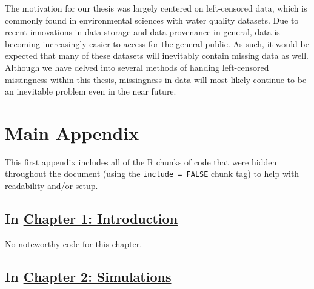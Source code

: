 \documentclass[12pt, twoside]{amherstthesis}
\begin{document}
The motivation for our thesis was largely centered on left-censored data, which is commonly found in environmental sciences with water quality datasets. Due to recent innovations in data storage and data provenance in general, data is becoming increasingly easier to access for the general public. As such, it would be expected that many of these datasets will inevitably contain missing data as well. Although we have delved into several methods of handing left-censored missingness within this thesis, missingness in data will most likely continue to be an inevitable problem even in the near future.

\appendix

\hypertarget{main-appendix}{%
\chapter{Main Appendix}\label{main-appendix}}

This first appendix includes all of the R chunks of code that were hidden throughout the document (using the \texttt{include\ =\ FALSE} chunk tag) to help with readability and/or setup.

\hypertarget{in-chapter-1-introduction}{%
\section{\texorpdfstring{In \protect\hyperlink{intro}{Chapter 1: Introduction}}{In Chapter 1: Introduction}}\label{in-chapter-1-introduction}}

No noteworthy code for this chapter.

\hypertarget{in-chapter-2-simulations}{%
\section{\texorpdfstring{In \protect\hyperlink{simulations}{Chapter 2: Simulations}}{In Chapter 2: Simulations}}\label{in-chapter-2-simulations}}
\end{document}
